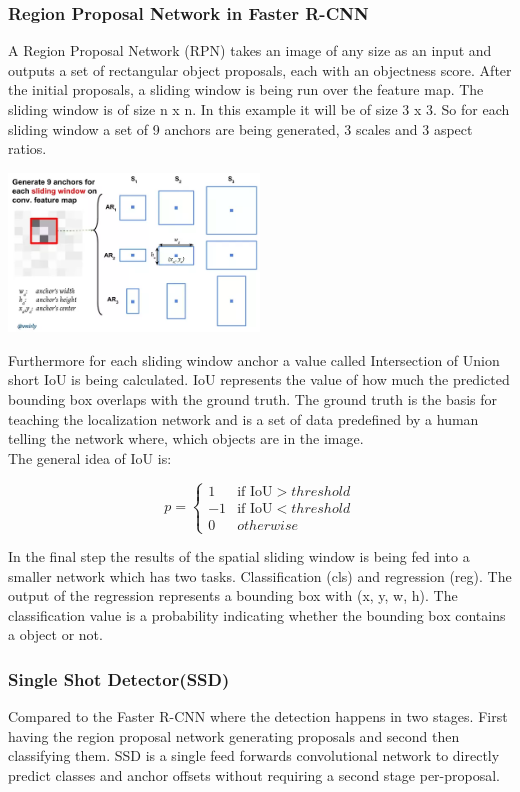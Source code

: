 \subsubsection{Region Proposal Network in Faster R-CNN}
A Region Proposal Network (RPN) takes an image of any size as an input and outputs a set of rectangular object proposals, each with an
objectness score. After the initial proposals, a sliding window is being run over the feature map. The sliding
window is of size n x n. In this example it will be of size 3 x 3. So for each sliding window a set of 9 anchors are being generated, 3
scales and 3 aspect ratios.\cite{fasterrcnn}
\begin{center}
    \includegraphics[width=0.5\textwidth]{images/object_detection/rpn_anchors.png}
\end{center}
Furthermore for each sliding window anchor a value called Intersection of Union short IoU is being calculated. IoU represents the value of how
much the predicted bounding box overlaps with the ground truth. The ground truth is the basis for teaching the localization network and is a
set of data predefined by a human telling the network where, which objects are in the image. \\
The general idea of IoU is:\cite{fasterrcnn}
\begin{center}
    \begin{equation*}
        p =
        \begin{cases} 
            1 & \text{if IoU} > threshold \\
            -1 & \text{if IoU} < threshold \\
            0 & otherwise
        \end{cases}
    \end{equation*}
\end{center}
In the final step the results of the spatial sliding window is being fed into a smaller network which has two tasks. Classification (cls)
and regression (reg). The output of the regression represents a bounding box with (x, y, w, h). The classification value is a probability
indicating whether the bounding box contains a object or not.\cite{fasterrcnn}

\subsubsection{Single Shot Detector(SSD)}
Compared to the Faster R-CNN where the detection happens in two stages. First having the region proposal network generating proposals and
second then classifying them. SSD is a single feed forwards convolutional network to directly predict classes and anchor offsets
without requiring a second stage per-proposal.

     
